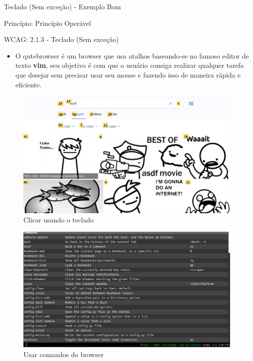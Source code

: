 \documentclass{beamer}
\begin{document}
\begin{frame}{Teclado (Sem exceção) - Exemplo Bom}

Princípio: Princípio Operável

WCAG: 2.1.3 - Teclado (Sem exceção)

\begin{itemize}
	\item O qutebrowser é um browser que usa atalhos baseando-se no famoso editor de texto \textbf{vim}, seu objetivo é com que o usuário consiga realizar qualquer tarefa que desejar sem precisar usar seu mouse e fazendo isso de maneira rápida e eficiente.
\end{itemize}
\begin{multicols}{2}
	\begin{figure}
	    \centering
	    \includegraphics[scale=0.2]{images/qutebrowser.png}
	    \caption{Clicar usando o teclado}
	\end{figure}
	\begin{figure}
	    \centering
	    \includegraphics[scale=0.2]{images/qutebrowser1.png}
	    \caption{Usar comandos do browser}
	\end{figure}
\end{multicols}

\end{frame}
\end{document}
